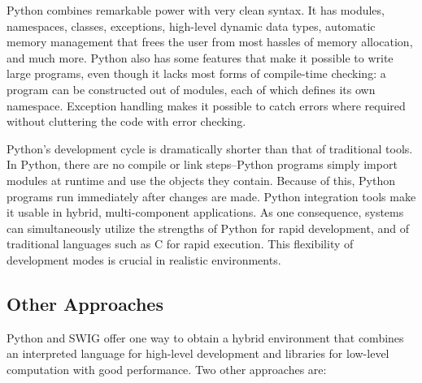 \documentclass[acmtocl]{acmtrans2m}
\begin{document}
Python combines remarkable power with very clean syntax. It has
modules, namespaces, classes, exceptions, high-level dynamic data
types, automatic memory management that frees the user from most
hassles of memory allocation, and much more. Python also has some
features that make it possible to write large programs, even though it
lacks most forms of compile-time checking: a program can be
constructed out of modules, each of which defines its own
namespace. Exception handling makes it possible to catch errors where
required without cluttering the code with error checking.

Python's development cycle is dramatically shorter than that of
traditional tools. In Python, there are no compile or link
steps--Python programs simply import modules at runtime and use the
objects they contain. Because of this, Python programs run immediately
after changes are made. Python integration tools make it usable in
hybrid, multi-component applications. As one consequence, systems can
simultaneously utilize the strengths of Python for rapid development,
and of traditional languages such as C for rapid execution.  This
flexibility of development modes is crucial in realistic environments.

\subsection{Other Approaches}

Python and SWIG offer one way to obtain a hybrid environment that
combines an interpreted language for high-level development and
libraries for low-level computation with good performance.  Two other
approaches are:
\end{document}
